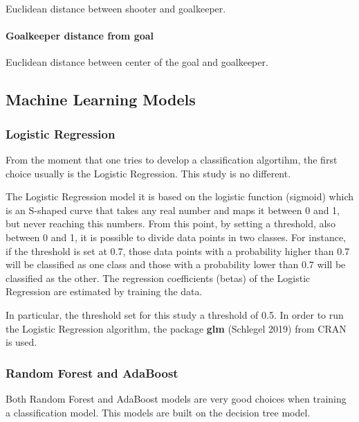 \documentclass[]{article}
\let\oldparagraph\paragraph
\renewcommand{\paragraph}[1]{\oldparagraph{#1}\mbox{}}
\begin{document}
Euclidean distance between shooter and goalkeeper.

\hypertarget{goalkeeper-distance-from-goal}{%
\paragraph{Goalkeeper distance from
goal}\label{goalkeeper-distance-from-goal}}

Euclidean distance between center of the goal and goalkeeper.

\hypertarget{machine-learning-models}{%
\subsection{Machine Learning Models}\label{machine-learning-models}}

\hypertarget{logistic-regression}{%
\subsubsection{Logistic Regression}\label{logistic-regression}}

From the moment that one tries to develop a classification algortihm,
the first choice usually is the Logistic Regression. This study is no
different.

The Logistic Regression model it is based on the logistic function
(sigmoid) which is an S-shaped curve that takes any real number and maps
it between 0 and 1, but never reaching this numbers. From this point, by
setting a threshold, also between 0 and 1, it is possible to divide data
points in two classes. For instance, if the threshold is set at 0.7,
those data points with a probability higher than 0.7 will be classified
as one class and those with a probability lower than 0.7 will be
classified as the other. The regression coefficients (betas) of the
Logistic Regression are estimated by training the data.

In particular, the threshold set for this study a threshold of 0.5. In
order to run the Logistic Regression algorithm, the package \textbf{glm}
(Schlegel 2019) from CRAN is used.

\hypertarget{random-forest-and-adaboost}{%
\subsubsection{Random Forest and
AdaBoost}\label{random-forest-and-adaboost}}

Both Random Forest and AdaBoost models are very good choices when
training a classification model. This models are built on the decision
tree model.
\end{document}

